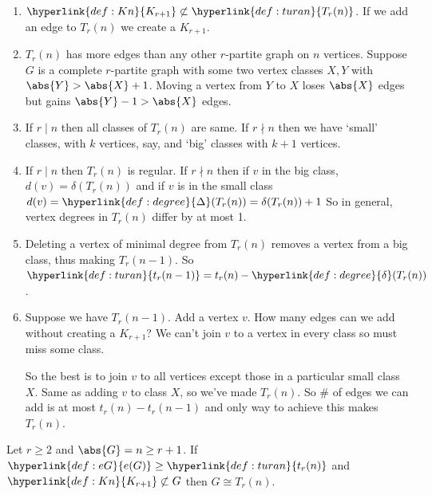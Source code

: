 \documentclass{article}
\begin{document}
\begin{remark}\leavevmode
\begin{enumerate}
    \item $\hyperlink{def:Kn}{K_{r+1}} \not\subset \hyperlink{def:turan}{T_r(n)}$. If we add an edge to $T_r(n)$ we create a $K_{r+1}$.
    \item $T_r(n)$ has more edges than any other $r$-partite graph on $n$ vertices. Suppose $G$ is a complete $r$-partite graph with some two vertex classes $X, Y$ with $\abs{Y} > \abs{X}+1$.
        Moving a vertex from $Y$ to $X$ loses $\abs{X}$ edges but gains $\abs{Y}-1 > \abs{X}$ edges.
    \item If $r \mid n$ then all classes of $T_r(n)$ are same.
        If $r \nmid n$ then we have `small' classes, with $k$ vertices, say, and `big' classes with $k+1$ vertices.
    \item If $r \mid n$ then $T_r(n)$ is regular.
        If $r \nmid n$ then if $v$ in the big class, $d(v) = \delta(T_r(n))$ and if $v$ is in the small class $d(v) = \hyperlink{def:degree}{\Delta}(T_r(n)) = \delta(T_r(n)) + 1$
        So in general, vertex degrees in $T_r(n)$ differ by at most 1.
    \item Deleting a vertex of minimal degree from $T_r(n)$ removes a vertex from a big class, thus making $T_r(n-1)$.
        So $\hyperlink{def:turan}{t_r(n-1)} = t_r(n) - \hyperlink{def:degree}{\delta}(T_r(n))$.
    \item Suppose we have $T_r(n-1)$. Add a vertex $v$. How many edges can we add without creating a $K_{r+1}$? We can't join $v$ to a vertex in every class so must miss some class.

        So the best is to join $v$ to all vertices except those in a particular small class $X$.
        Same as adding $v$ to class $X$, so we've made $T_r(n)$. So \# of edges we can add is at most $t_r(n) - t_r(n-1)$ and only way to achieve this makes $T_r(n)$.
\end{enumerate}
\end{remark}

\begin{nthm}\label{thm:9}
    Let $r \geq 2$ and $\abs{G} = n \geq r+1$. If $\hyperlink{def:eG}{e(G)} \geq \hyperlink{def:turan}{t_r(n)}$ and $\hyperlink{def:Kn}{K_{r+1}} \not\subset G$ then $G \cong T_r(n)$.
\end{nthm}
\end{document}
